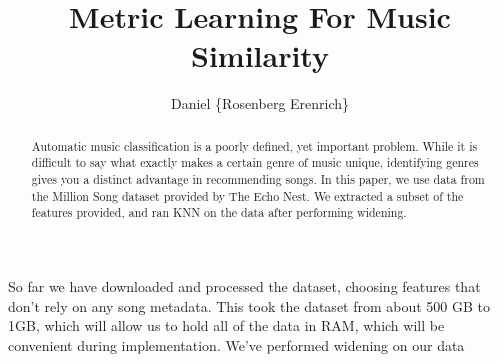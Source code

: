 \documentclass[a4paper,10pt]{article}
\title{Metric Learning For Music Similarity}
\author{Daniel \{Rosenberg Erenrich\} }
\begin{document}
\maketitle

\begin{abstract}
Automatic music classification is a poorly defined, yet important problem. While it is difficult to say what exactly makes a certain genre of music unique, identifying genres gives you a distinct advantage in recommending songs. In this paper, we use data from the Million Song dataset provided by The Echo Nest. We extracted a subset of the features provided, and ran KNN on the data after performing widening.
\end{abstract}

\section{}
So far we have downloaded and processed the dataset, choosing features that don't rely on any song metadata. This took the dataset from about 500 GB to 1GB, which will allow us to hold all of the data in RAM, which will be convenient during implementation. We've performed widening on our data 
\end{document}
